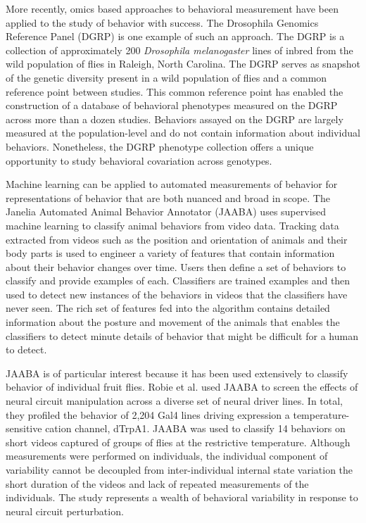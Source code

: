 \documentclass[12pt,letterpaper]{article}
\begin{document}
More recently, omics based approaches to behavioral measurement have been applied to the study of behavior with success. The Drosophila Genomics Reference Panel (DGRP) is one example of such an approach. The DGRP is a collection of approximately 200 \textit{Drosophila melanogaster} lines of inbred from the wild population of flies in Raleigh, North Carolina. The DGRP serves as snapshot of the genetic diversity present in a wild population of flies and a common reference point between studies. This common reference point has enabled the construction of a database of behavioral phenotypes measured on the DGRP across more than a dozen studies. Behaviors assayed on the DGRP are largely measured at the population-level and do not contain information about individual behaviors. Nonetheless, the DGRP phenotype collection offers a unique opportunity to study behavioral covariation across genotypes.

Machine learning can be applied to automated measurements of behavior for representations of behavior that are both nuanced and broad in scope. The Janelia Automated Animal Behavior Annotator (JAABA) uses supervised machine learning to classify animal behaviors from video data. Tracking data extracted from videos such as the position and orientation of animals and their body parts is used to engineer a variety of features that contain information about their behavior changes over time. Users then define a set of behaviors to classify and provide examples of each. Classifiers are trained examples and then used to detect new instances of the behaviors in videos that the classifiers have never seen. The rich set of features fed into the algorithm contains detailed information about the posture and movement of the animals that enables the classifiers to detect minute details of behavior that might be difficult for a human to detect. 

JAABA is of particular interest because it has been used extensively to classify behavior of individual fruit flies. Robie et al. used JAABA to screen the effects of neural circuit manipulation across a diverse set of neural driver lines. In total, they profiled the behavior of 2,204 Gal4 lines driving expression a temperature-sensitive cation channel, dTrpA1. JAABA was used to classify 14 behaviors on short videos captured of groups of flies at the restrictive temperature. Although measurements were performed on individuals, the individual component of variability cannot be decoupled from inter-individual internal state variation the short duration of the videos and lack of repeated measurements of the individuals. The study represents a wealth of behavioral variability in response to neural circuit perturbation.
\end{document}
